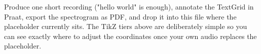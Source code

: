 \documentclass[11pt,a4paper]{article}
\begin{document}
Produce one short recording ("hello world" is enough), annotate the TextGrid
in Praat, export the spectrogram as PDF, and drop it into this file where the
placeholder currently sits. The TikZ tiers above are deliberately simple so
you can see exactly where to adjust the coordinates once your own audio
replaces the placeholder.
\end{document}
